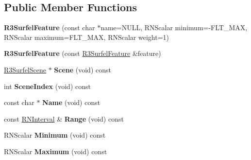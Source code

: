 \subsection*{Public Member Functions}
\begin{DoxyCompactItemize}
\item 
{\bfseries R3\+Surfel\+Feature} (const char $\ast$name=N\+U\+LL, R\+N\+Scalar minimum=-\/F\+L\+T\+\_\+\+M\+AX, R\+N\+Scalar maximum=F\+L\+T\+\_\+\+M\+AX, R\+N\+Scalar weight=1)\hypertarget{class_r3_surfel_feature_a029ddf68205af4fa97395025c45654ef}{}\label{class_r3_surfel_feature_a029ddf68205af4fa97395025c45654ef}

\item 
{\bfseries R3\+Surfel\+Feature} (const \hyperlink{class_r3_surfel_feature}{R3\+Surfel\+Feature} \&feature)\hypertarget{class_r3_surfel_feature_a918622779869655d8d855889d84f768b}{}\label{class_r3_surfel_feature_a918622779869655d8d855889d84f768b}

\item 
\hyperlink{class_r3_surfel_scene}{R3\+Surfel\+Scene} $\ast$ {\bfseries Scene} (void) const \hypertarget{class_r3_surfel_feature_a0221b0b9e0d8f9d9de003453f5f4fb89}{}\label{class_r3_surfel_feature_a0221b0b9e0d8f9d9de003453f5f4fb89}

\item 
int {\bfseries Scene\+Index} (void) const \hypertarget{class_r3_surfel_feature_a4c4167e2eaee028883a7d99640ca8592}{}\label{class_r3_surfel_feature_a4c4167e2eaee028883a7d99640ca8592}

\item 
const char $\ast$ {\bfseries Name} (void) const \hypertarget{class_r3_surfel_feature_a392c65e8d9dc2e7370b712e724a9baa1}{}\label{class_r3_surfel_feature_a392c65e8d9dc2e7370b712e724a9baa1}

\item 
const \hyperlink{class_r_n_interval}{R\+N\+Interval} \& {\bfseries Range} (void) const \hypertarget{class_r3_surfel_feature_ae0a6115e3acdff2c77a318d12a2e645f}{}\label{class_r3_surfel_feature_ae0a6115e3acdff2c77a318d12a2e645f}

\item 
R\+N\+Scalar {\bfseries Minimum} (void) const \hypertarget{class_r3_surfel_feature_a56fa29ddf4496106b9819d68a1d39e99}{}\label{class_r3_surfel_feature_a56fa29ddf4496106b9819d68a1d39e99}

\item 
R\+N\+Scalar {\bfseries Maximum} (void) const \hypertarget{class_r3_surfel_feature_a5dfcbf0c0bcc73c97b5fc3e960b05269}{}\label{class_r3_surfel_feature_a5dfcbf0c0bcc73c97b5fc3e960b05269}


\end{DoxyCompactItemize}
